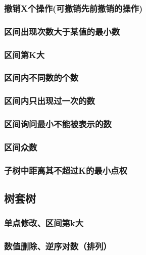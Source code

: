 \documentclass[10pt,a4paper]{article}
\begin{document}
\subsubsection{撤销X个操作(可撤销先前撤销的操作)}

\subsubsection{区间出现次数大于某值的最小数}

\subsubsection{区间第K大}

\subsubsection{区间内不同数的个数}

\subsubsection{区间内只出现过一次的数}

\subsubsection{区间询问最小不能被表示的数}

\subsubsection{区间众数}

\subsubsection{子树中距离其不超过K的最小点权}

\subsection{树套树}
\subsubsection{单点修改、区间第k大}

\subsubsection{数值删除、逆序对数（排列）}

\end{document}
